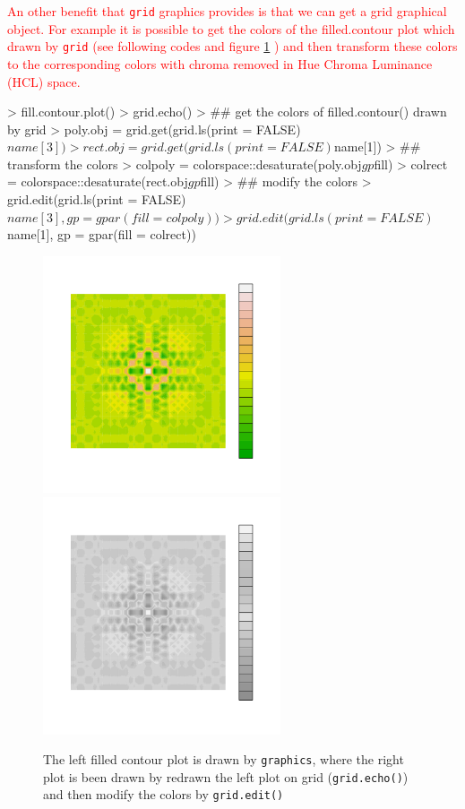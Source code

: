 \documentclass[paper=a4, fontsize=11pt]{report}
\begin{document}
\textcolor{red}{
An other benefit that \texttt{grid} graphics provides is that we can get a grid graphical object. For example it is possible to get the colors of the filled.contour plot which drawn by \texttt{grid} (see following codes and figure \ref{Example_6.1} ) and then transform these colors to the corresponding colors with chroma removed in Hue Chroma Luminance (HCL) space.}
\begin{Schunk}
\begin{Sinput}
> fill.contour.plot()
> grid.echo()
> ## get the colors of filled.contour() drawn by grid
> poly.obj = grid.get(grid.ls(print = FALSE)$name[3])
> rect.obj = grid.get(grid.ls(print = FALSE)$name[1])
> ## transform the colors
> colpoly = colorspace::desaturate(poly.obj$gp$fill)
> colrect = colorspace::desaturate(rect.obj$gp$fill)
> ## modify the colors
> grid.edit(grid.ls(print = FALSE)$name[3], gp = gpar(fill = colpoly))
> grid.edit(grid.ls(print = FALSE)$name[1], gp = gpar(fill = colrect))
\end{Sinput}
\end{Schunk}



\begin{figure}[h!]
	\begin{center}
		\includegraphics[height = 7cm, width = 7cm]{figure/Chapter6_example_2_2.pdf}
		\includegraphics[height = 7cm, width = 7cm]{figure/Chapter6_example_2_4.pdf}
		\caption{The left filled contour plot is drawn by \texttt{graphics}, where the right plot is been drawn by redrawn the left plot on grid (\texttt{grid.echo()}) and then modify the colors by \texttt{grid.edit()}}
		\label{Example_6.1}
	\end{center}
\end{figure}
\end{document}
